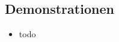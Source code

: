   \subsection{Demonstrationen}
    \begin{frame}
      \begin{itemize}
        \item
          todo
  
      \end{itemize}
    \end{frame}



